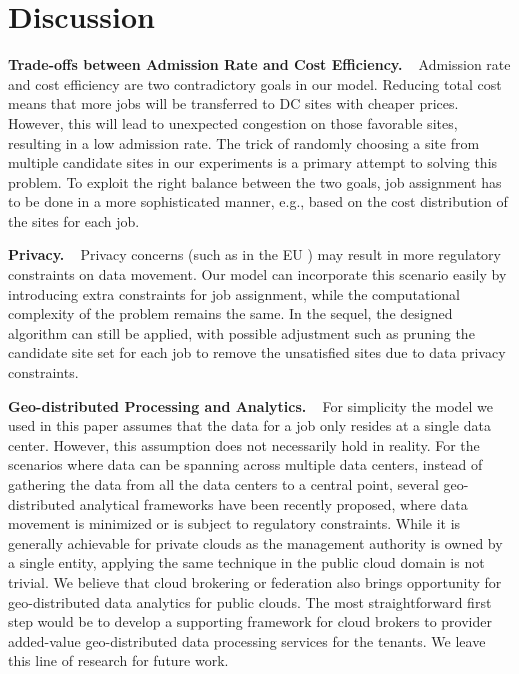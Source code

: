 \documentclass{article}
\newcommand{\bpara}[2]{\noindent\textbf{#1~~}{#2}}
\begin{document}
\section{Discussion}
\label{sec:disc}

\bpara{Trade-offs between Admission Rate and Cost Efficiency.}
Admission rate and cost efficiency are two contradictory goals in our model. Reducing total cost means that more jobs will be transferred to DC sites with cheaper prices. However, this will lead to unexpected congestion on those favorable sites, resulting in a low admission rate. The trick of randomly choosing a site from multiple candidate sites in our experiments is a primary attempt to solving this problem. To exploit the right balance between the two goals, job assignment has to be done in a more sophisticated manner, e.g., based on the cost distribution of the sites for each job. 

\bpara{Privacy.}
Privacy concerns (such as in the EU \cite{EU-privacy-2014}) may result in more regulatory constraints on data movement. Our model can incorporate this scenario easily by introducing extra constraints for job assignment, while the computational complexity of the problem remains the same. In the sequel, the designed algorithm can still be applied, with possible adjustment such as pruning the candidate site set for each job to remove the unsatisfied sites due to data privacy constraints.

\bpara{Geo-distributed Processing and Analytics.} For simplicity the model we used in this paper assumes that the data for a job only resides at a single data center. However, this assumption does not necessarily hold in reality. For the scenarios where data can be spanning across multiple data centers, instead of gathering the data from all the data centers to a central point, several geo-distributed analytical frameworks \cite{Pu-GEO-2015, Vulimiri-Iridium-2015} have been recently proposed, where data movement is minimized or is subject to regulatory constraints. While it is generally achievable for private clouds as the management authority is owned by a single entity, applying the same technique in the public cloud domain is not trivial. We believe that cloud brokering or federation also brings opportunity for geo-distributed data analytics for public clouds. The most straightforward first step would be to develop a supporting framework for cloud brokers to provider added-value geo-distributed data processing services for the tenants. We leave this line of research for future work.
\end{document}
